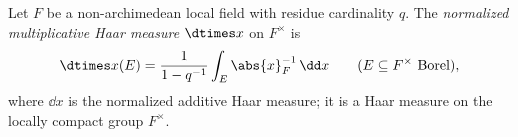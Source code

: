 Let $F$ be a non-archimedean local field with residue cardinality $q$. The \emph{normalized multiplicative Haar
measure} $\dtimes x$ on $F^\times$ is
\[
  \dtimes x(E)=\frac1{1-q^{-1}}\int_E\abs{x}_F^{-1}\,\dd x\qquad(E\subseteq F^\times\text{ Borel}),
\]
where $\dd x$ is the normalized additive Haar measure; it is a Haar measure on the locally compact group $F^\times$.
